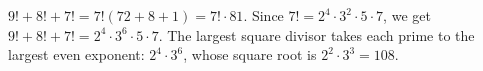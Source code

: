 $9!+8!+7!=7!(72+8+1)=7!\cdot81$. Since $7!=2^4\cdot3^2\cdot5\cdot7$, we get $9!+8!+7!=2^4\cdot3^6\cdot5\cdot7$. The largest square divisor takes each prime to the largest even exponent: $2^4\cdot3^6$, whose square root is $2^2\cdot3^3=\boxed{108}$.
